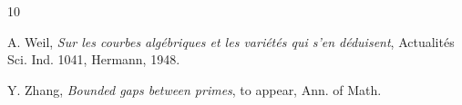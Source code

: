\documentclass[12pt,a4paper,reqno]{amsart}
\numberwithin{equation}{section}
\theoremstyle{plain}
\theoremstyle{definition}
\begin{document}
\begin{thebibliography}{10}


 A. Weil, \emph{Sur les courbes alg\'ebriques et les
    vari\'et\'es qui s'en d\'eduisent}, Actualit\'es Sci. Ind. 1041,
  Hermann, 1948.


 Y. Zhang, \emph{Bounded gaps between primes}, to
  appear, Ann. of Math.

\end{thebibliography}


\end{document}
